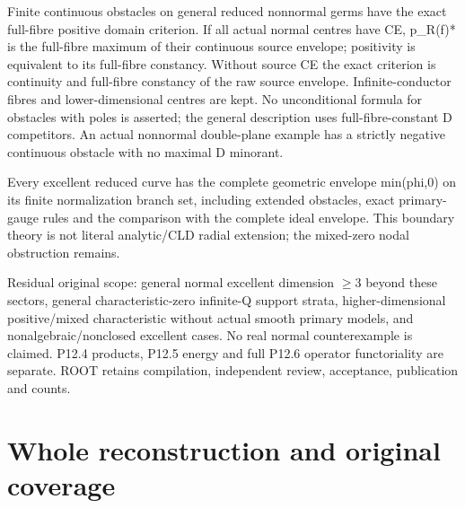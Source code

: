 \documentclass[11pt]{article}
\begin{document}
Finite continuous obstacles on general reduced nonnormal germs have the exact full-fibre positive domain criterion. If all actual normal centres have CE, p\_R(f)* is the full-fibre maximum of their continuous source envelope; positivity is equivalent to its full-fibre constancy. Without source CE the exact criterion is continuity and full-fibre constancy of the raw source envelope. Infinite-conductor fibres and lower-dimensional centres are kept. No unconditional formula for obstacles with poles is asserted; the general description uses full-fibre-constant D competitors. An actual nonnormal double-plane example has a strictly negative continuous obstacle with no maximal D minorant.

Every excellent reduced curve has the complete geometric envelope min(phi,0) on its finite normalization branch set, including extended obstacles, exact primary-gauge rules and the comparison with the complete ideal envelope. This boundary theory is not literal analytic/CLD radial extension; the mixed-zero nodal obstruction remains.

Residual original scope: general normal excellent dimension \ensuremath{\geq}3 beyond these sectors, general characteristic-zero infinite-Q support strata, higher-dimensional positive/mixed characteristic without actual smooth primary models, and nonalgebraic/nonclosed excellent cases. No real normal counterexample is claimed. P12.4 products, P12.5 energy and full P12.6 operator functoriality are separate. ROOT retains compilation, independent review, acceptance, publication and counts. 

\section{Whole reconstruction and original coverage}
\end{document}
